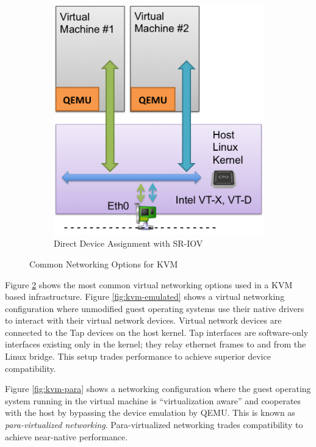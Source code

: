 \begin{enumerate}
\begin{figure}
\begin{subfigure}[b]{0.42\textwidth}
                \includegraphics[width=\textwidth]{kvm-direct-sriov.png}
                \caption{Direct Device Assignment with SR-IOV}
                \label{fig:kvm-direct-sriov}
        \end{subfigure}
        \caption{Common Networking Options for KVM}\label{fig:kvm-networking}
\end{figure} Figure \ref{fig:kvm-networking} shows the most common virtual networking options used in a KVM based infrastructure. Figure \ref{fig:kvm-emulated} shows a virtual networking configuration where unmodified guest operating systems use their native drivers to interact with their virtual network devices. Virtual network devices are connected to the Tap devices \cite{Tap_devices} on the host kernel. Tap interfaces are software-only interfaces existing only in the kernel; they relay ethernet frames to and from the Linux bridge. This setup trades performance to achieve superior device compatibility.



Figure \ref{fig:kvm-para} shows a networking configuration where the guest operating system running in the virtual machine is ``virtualization aware'' and cooperates with the host by bypassing the device emulation by QEMU. This is known as \emph{para-virtualized networking}. Para-virtualized networking trades compatibility to achieve near-native performance.




\end{enumerate}
